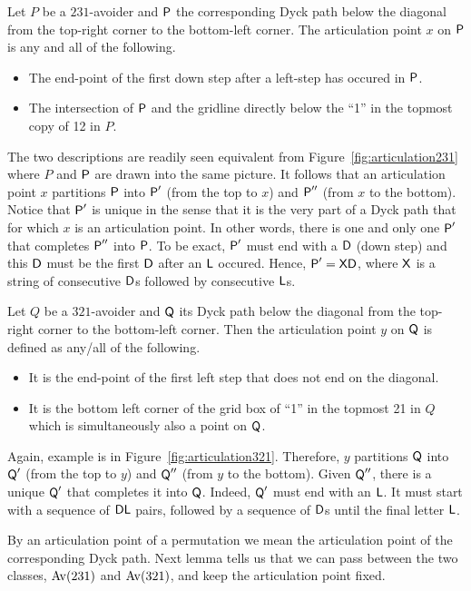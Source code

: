 \documentclass[12pt, a4paper, twoside]{report}
\begin{document}
Let $P$ be a $231$-avoider and $\textsf{P}$ the corresponding Dyck path below the diagonal from the top-right corner to the bottom-left corner. The articulation point $x$ on $\textsf{P}$ is any and all of the following.
\begin{itemize}
\item The end-point of the first down step after a left-step has occured in $\textsf{P}$.
\item The intersection of $\textsf{P}$ and the gridline directly below the ``1'' in the topmost copy of 12 in $P$.
\end{itemize}
The two descriptions are readily seen equivalent from Figure~\ref{fig:articulation231} where $P$ and $\textsf{P}$ are drawn into the same picture. It follows that an articulation point $x$ partitions $\textsf{P}$ into $\textsf{P}'$ (from the top to $x$) and $\textsf{P}''$ (from $x$ to the bottom). Notice that $\textsf{P}'$ is unique in the sense that it is the very part of a Dyck path that for which $x$ is an articulation point. In other words, there is one and only one $\textsf{P}'$ that completes $\textsf{P}''$ into $\textsf{P}$. To be exact, $\textsf{P}'$ must end with a $\mathsf{D}$ (down step) and this $\mathsf{D}$ must be the first $\mathsf{D}$ after an $\mathsf{L}$ occured. Hence, $\textsf{P}' = \mathsf{X}\mathsf{D}$, where $\mathsf{X}$ is a string of consecutive $\mathsf{D}$s followed by consecutive $\mathsf{L}$s.

Let $Q$ be a $321$-avoider and $\textsf{Q}$ its Dyck path below the diagonal from the top-right corner to the bottom-left corner. Then the articulation point $y$ on $\textsf{Q}$ is defined as any/all of the following.
\begin{itemize}
\item It is the end-point of the first left step that does not end on the diagonal.
\item It is the bottom left corner of the grid box of ``1'' in the topmost 21 in $Q$ which is simultaneously also a point on $\textsf{Q}$.
\end{itemize}
Again, example is in Figure~\ref{fig:articulation321}. Therefore, $y$ partitions $\textsf{Q}$ into $\textsf{Q}'$ (from the top to $y$) and $\textsf{Q}''$ (from $y$ to the bottom). Given $\textsf{Q}''$, there is a unique $\textsf{Q}'$ that completes it into $\textsf{Q}$. Indeed, $\textsf{Q}'$ must end with an $\mathsf{L}$. It must start with a sequence of $\mathsf{D}\mathsf{L}$ pairs, followed by a sequence of $\mathsf{D}$s until the final letter $\mathsf{L}$.

By an articulation point of a permutation we mean the articulation point of the corresponding Dyck path. Next lemma tells us that we can pass between the two classes, $\mathrm{Av}(231)$ and $\mathrm{Av}(321)$, and keep the articulation point fixed.
\end{document}
